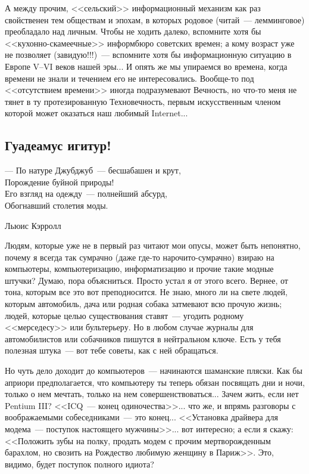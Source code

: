 \documentclass{scrbook}
\makeatletter
\newcommand{\defaultepigraphwidth}{0.5} %
\newcommand{\flqq}{<<}
\newcommand{\frqq}{>>}
\newcommand{\mdash}{~--- }
\newcommand{\ndash}{--}
\newcommand{\sdash}{--- } %
\newcommand{\essaysection}[1]{\subsection*{#1}\nopagebreak}
\newcommand{\myepigraph}[3][\@empty]{
	\ifx\@empty#1
		\setlength{\epigraphwidth}{\defaultepigraphwidth\textwidth}
	\else
		\setlength{\epigraphwidth}{#1\textwidth}
	\fi
	\epigraph{#2}{#3}
	\setlength{\epigraphwidth}{\defaultepigraphwidth\textwidth} %
	\nopagebreak
}
\makeatother
\begin{document}
А между прочим, {\flqq}сельский{\frqq} информационный механизм как раз свойственен тем обществам и эпохам, в которых родовое (читай{\mdash}лемминговое) преобладало над личным. Чтобы не ходить далеко, вспомните хотя бы {\flqq}кухонно-скамеечные{\frqq} информбюро советских времен; а кому возраст уже не позволяет (завидую!!!){\mdash}вспомните хотя бы информационную ситуацию в Европе V{\ndash}VI веков нашей эры... И опять же мы упираемся во времена, когда времени не знали и течением его не интересовались. Вообще-то под {\flqq}отсутствием времени{\frqq} иногда подразумевают Вечность, но что-то меня не тянет в ту протезированную Техновечность, первым искусственным членом которой может оказаться наш любимый Internet...

\essaysection{Гуадеамус игитур!}

\myepigraph{{\sdash} По натуре Джубджуб{\mdash}бесшабашен и крут, \\
Порождение буйной природы! \\
Его взгляд на одежду{\mdash}полнейший абсурд, \\
Обогнавший столетия моды.}
{Льюис Кэрролл}

Людям, которые уже не в первый раз читают мои опусы, может быть непонятно, почему я всегда так сумрачно (даже где-то нарочито-сумрачно) взираю на компьютеры, компьютеризацию, информатизацию и прочие такие модные штучки? Думаю, пора объясниться. Просто устал я от этого всего. Вернее, от тона, которым все это вот преподносится. Не знаю, много ли на свете людей, которым автомобиль, дача или родная собака затмевают всю прочую жизнь; людей, которые целью существования ставят{\mdash}угодить родному {\flqq}мерседесу{\frqq} или бультерьеру. Но в любом случае журналы для автомобилистов или собачников пишутся в нейтральном ключе. Есть у тебя полезная штука{\mdash}вот тебе советы, как с ней обращаться.

Но чуть дело доходит до компьютеров{\mdash}начинаются шаманские пляски. Как бы априори предполагается, что компьютеру ты теперь обязан посвящать дни и ночи, только о нем мечтать, только на нем совершенствоваться... Зачем жить, если нет Pentium III? {\flqq}ICQ{\mdash}конец одиночества{\frqq}... что же, и впрямь разговоры с воображаемыми собеседниками{\mdash}это конец... {\flqq}Установка драйвера для модема{\mdash}поступок настоящего мужчины{\frqq}... вот интересно; а если я скажу: {\flqq}Положить зубы на полку, продать модем с прочим мертворожденным барахлом, но свозить на Рождество любимую женщину в Париж{\frqq}. Это, видимо, будет поступок полного идиота?
\end{document}

